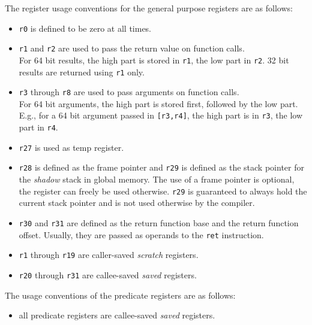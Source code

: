 \documentclass[a4paper,fontsize=10pt,twoside,DIV15,BCOR12mm,headinclude=true,footinclude=false,pagesize,bibtotoc]{scrbook}
\newcommand{\comment}[3]{

\textsf{\textbf{#1}} {\color{#3}#2}}
\newcommand{\daniel}[1]{\comment{Daniel}{#1}{RoyalBlue}}
\newcommand{\fb}[1]{\comment{Florian}{#1}{Emerald}}
\renewcommand{\daniel}[1]{}
\renewcommand{\fb}[1]{}
\begin{document}
The register usage conventions for the general purpose registers are as follows:
\begin{itemize}
  \item \texttt{r0} is defined to be zero at all times.
  \item \texttt{r1} and \texttt{r2} are used to pass the return value on
        function calls. \\
        For 64 bit results, the high part is stored in \texttt{r1},
        the low part in \texttt{r2}.
	32 bit results are returned using \texttt{r1} only.
  \item \texttt{r3} through \texttt{r8} are used to pass arguments on function
        calls. \\
        For 64 bit arguments, the high part is stored first,
        followed by the low part.\\ E.g., for a 64 bit argument passed in
        \texttt{[r3,r4]}, the high part is in \texttt{r3}, the low part
        in \texttt{r4}.
  \item \texttt{r27} is used as temp register.
  \item \texttt{r28} is defined as the frame pointer and \texttt{r29} is defined as the stack
        pointer for the \emph{shadow} stack in global memory. The use of a frame
        pointer is optional, the register can freely be used otherwise.
	\texttt{r29} is guaranteed to always hold the current stack pointer and is not used
	otherwise by the compiler.
  \item \texttt{r30} and \texttt{r31} are defined as the return function base
        and the return function offset.
        Usually, they are passed as operands to the \texttt{ret} instruction.
  \item \texttt{r1} through \texttt{r19} are caller-saved \emph{scratch}
        registers.
  \item \texttt{r20} through \texttt{r31} are callee-saved \emph{saved}
        registers.
\end{itemize}

The usage conventions of the predicate registers are as follows:
\begin{itemize}
  \item all predicate registers are callee-saved \emph{saved} registers.
\end{itemize}

\daniel{I have no educated opinion whether caller- or callee-saved.}
\fb{This is rather easy to change in the compiler, and should be evaluated
accordingly.}
\end{document}
